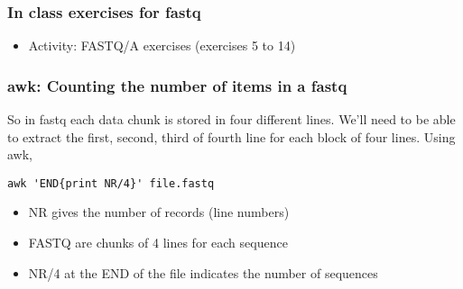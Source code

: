 \documentclass{beamer}
\begin{document}
\begin{frame}
  \frametitle{In class exercises for fastq}
  \begin{itemize}
  \item Activity: FASTQ/A exercises (exercises 5 to 14)
  \end{itemize}
\end{frame}







\begin{frame}[fragile]
  \frametitle{awk: Counting the number of items in a fastq}

So in fastq each data chunk is stored in four different lines. We'll need to be able to extract the first, second, third of fourth line for each block of four lines. Using awk,

\begin{verbatim}
awk 'END{print NR/4}' file.fastq
\end{verbatim}
\begin{itemize}
  
  \item NR gives the number of records (line numbers)
  \item FASTQ are chunks of 4 lines for each sequence
  \item NR/4 at the END of the file indicates the number of sequences
  \end{itemize}
\end{frame}
\end{document}
